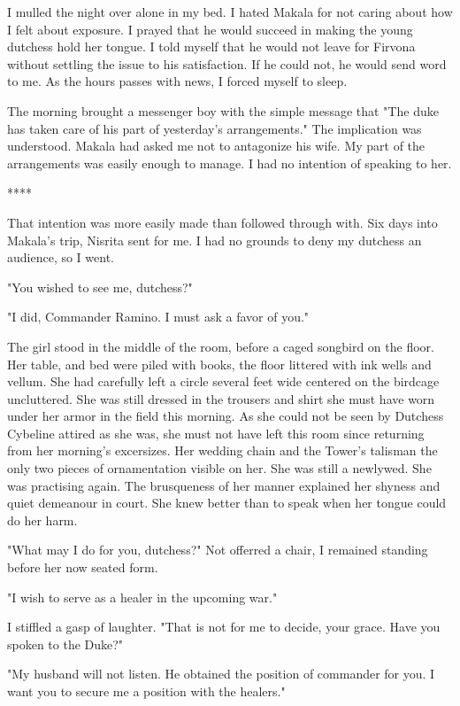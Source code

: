 \documentclass{article}
\begin{document}
I mulled the night over alone in my bed. I hated Makala for not caring about how I felt about exposure. I prayed that he would succeed in making the young dutchess hold her tongue. I told myself that he would not leave for Firvona without settling the issue to his satisfaction. If he could not, he would send word to me. As the hours passes with news, I forced myself to sleep.

The morning brought a messenger boy with the simple message that "The duke has taken care of his part of yesterday's arrangements." The implication was understood. Makala had asked me not to antagonize his wife. My part of the arrangements was easily enough to manage. I had no intention of speaking to her.

****

That intention was more easily made than followed through with. Six days into Makala's trip, Nisrita sent for me. I had no grounds to deny my dutchess an audience, so I went.

"You wished to see me, dutchess?"

"I did, Commander Ramino. I must ask a favor of you."

The girl stood in the middle of the room, before a caged songbird on the floor. Her table, and bed were piled with books, the floor littered with ink wells and vellum. She had carefully left a circle several feet wide centered on the birdcage uncluttered. She was still dressed in the trousers and shirt she must have worn under her armor in the field this morning. As she could not be seen by Dutchess Cybeline attired as she was, she must not have left this room since returning from her morning's excersizes. Her wedding chain and the Tower's talisman the only two pieces of ornamentation visible on her. She was still a newlywed. She was practising again. The brusqueness of her manner explained her shyness and quiet demeanour in court. She knew better than to speak when her tongue could do her harm. 

"What may I do for you, dutchess?" Not offerred a chair, I remained standing before her now seated form.

"I wish to serve as a healer in the upcoming war."

I stiffled a gasp of laughter. "That is not for me to decide, your grace. Have you spoken to the Duke?"

"My husband will not listen. He obtained the position of commander for you. I want you to secure me a position with the healers."
\end{document}
